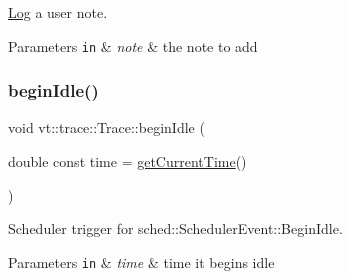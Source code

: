 \hyperlink{structvt_1_1trace_1_1_log}{Log} a user note. 


\begin{DoxyParams}[1]{Parameters}
\mbox{\tt in}  & {\em note} & the note to add \\
\hline
\end{DoxyParams}
\mbox{\label{structvt_1_1trace_1_1_trace_a530af1b7b48cf389744325f6f7e7f05e}} 
\subsubsection{\texorpdfstring{begin\+Idle()}{beginIdle()}}
{\footnotesize\ttfamily void vt\+::trace\+::\+Trace\+::begin\+Idle (\begin{DoxyParamCaption}\item[{double const}]{time = {\ttfamily \hyperlink{structvt_1_1trace_1_1_trace_a04cf6b76b4ced1bc90d246a34c948db5}{get\+Current\+Time}()} }\end{DoxyParamCaption})}



Scheduler trigger for {\ttfamily sched\+::\+Scheduler\+Event\+::\+Begin\+Idle}. 


\begin{DoxyParams}[1]{Parameters}
\mbox{\tt in}  & {\em time} & time it begins idle \\
\hline
\end{DoxyParams}
\mbox{\label{structvt_1_1trace_1_1_trace_a8f1a745228757b9d2ece4cd226d9540c}} 
